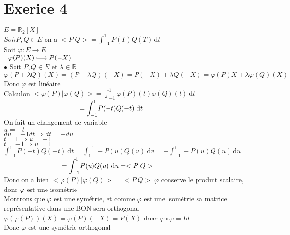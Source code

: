 \documentclass{article}
\author{Frederic Becerril}
\newcommand\tab[1][1cm]{\hspace*{#1}}
\begin{document}
\part*{Exerice 4}

$E = \mathbb{R}_2[X]$\\
$Soit P, Q \in E$ on a $<P|Q> = \displaystyle{\int_{-1}^{1}}P(T)Q(T)~\textrm{d}t$\\
Soit $\varphi : E \rightarrow E$\\
$\tab[2mm] \varphi(P)(X) \longmapsto P(-X)$\\
$\bullet$ Soit $P, Q \in E$ et $\lambda \in \mathbb{R}$\\
$\varphi(P + \lambda Q)(X) = (P + \lambda Q)(-X) = P(-X) + \lambda Q(-X) = \varphi(P)X + \lambda\varphi(Q)(X)$\\
Donc $\varphi$ est linéaire\\
Calculon $<\varphi(P)|\varphi(Q)> = \displaystyle{\int_{-1}^{1}} \varphi(P)(t) \varphi(Q)(t)~\textrm{d}t$\\
$\tab[3.9cm] = \displaystyle{\int_{-1}^{1}} P(-t)Q(-t)~\textrm{d}t$\\
On fait un changement de variable\\
$u = -t$\\
$du = -1dt \Rightarrow dt = -du$\\
$t = 1 \Rightarrow u = -1$\\
$t = -1 \Rightarrow u = 1$\\
$\displaystyle{\int_{-1}^{1}} P(-t)Q(-t)~\textrm{d}t = \displaystyle{\int_{1}^{-1}} -P(u)Q(u)~\textrm{d}u = -\displaystyle{\int_{-1}^{1}} -P(u)Q(u)~\textrm{d}u$\\
$\tab[3cm] = \displaystyle{\int_{-1}^{1}} P(u)Q(u)~\textrm{d}u = <P|Q>$\\
Donc on a bien $<\varphi(P)|\varphi(Q)> = <P|Q>$ $\varphi$ conserve le produit scalaire, donc $\varphi$ est une isométrie\\
Montrons que $\varphi$ est une symétrie, et comme $\varphi$ est une isométrie sa matrice représentative dans une BON sera orthogonal\\
$\varphi(\varphi(P))(X) = \varphi(P)(-X) = P(X)$ donc $\varphi \circ \varphi = Id$\\
Donc $\varphi$ est une symétrie orthogonal\\

\newpage
\end{document}
